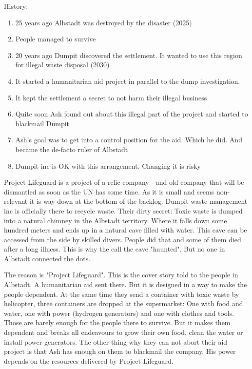 History:
\begin{enumerate}
    \item 25 years ago Albstadt was destroyed by the disaster (2025)
    \item People managed to survive
    \item 20 years ago Dumpit discovered the settlement. It wanted to use this region for illegal waste disposal (2030)
    \item It started a humanitarian aid project in parallel to the dump investigation.
    \item It kept the settlement a secret to not harm their illegal business
    \item Quite soon Ash found out about this illegal part of the project and started to blackmail Dumpit
    \item Ash's goal was to get into a control position for the aid. Which he did. And became the de-facto ruler of Albstadt
    \item Dumpit inc is OK with this arrangement. Changing it is risky
\end{enumerate}

Project Lifeguard is a project of a relic company - and old company that will be dismantled as soon as the UN has some time. As it is small and seems non-relevant it is way down at the bottom of the backlog.
Dumpit waste management inc is officially there to recycle waste. Their dirty secret: Toxic waste is dumped into a natural chimney in the Albstadt territory. Where it falls down some hundred meters and ends up in a natural cave filled with water. This cave can be accessed from the side by skilled divers. People did that and some of them died after a long illness. This is why the call the cave "haunted". But no one in Albstadt connected the dots.

The reason is "Project Lifeguard". This is the cover story told to the people in Albstadt. A humanitarian aid sent there. But it is designed in a way to make the people dependent. At the same time they send a container with toxic waste by helicopter, three containers are dropped at the supermarket: One with food and water, one with power (hydrogen generators) and one with clothes and tools.
Those are barely enough for the people there to survive. But it makes them dependent and breaks all endeavours to grow their own food, clean the water or install power generators.
The other thing why they can not abort their aid project is that Ash has enough on them to blackmail the company. His power depends on the resources delivered by Project Lifeguard.

